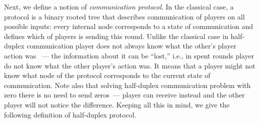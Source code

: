 Next, we define a notion of \emph{communication protocol}. 
In the classical case, a protocol is a binary rooted tree that describes communication of players on all possible inputs: every internal node corresponds to a state of communication and defines which of players is sending
this round. Unlike the classical case in half-duplex
communication player does not always know what the
other's player action was ~--- the information about it can be ``lost,'' i.e., in spent rounds player do not know what the other player's action was. 
It means that a player might not know what node of the protocol corresponds
to the current state of communication. 
Note also that solving half-duplex communication problem with zero 
there is no need to send zeros~--- player can receive instead and 
the other player will not notice the difference.
Keeping all this in mind, we give the following definition 
of half-duplex protocol.
